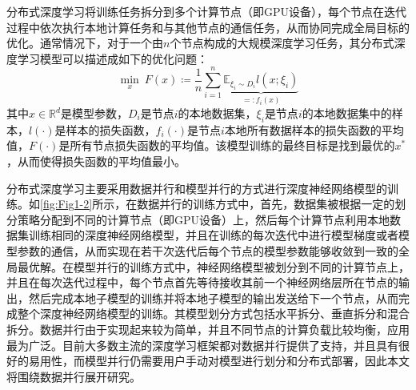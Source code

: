 \begin{table}[!htbp]
    \centering
    \caption{单GPU训练ResNet-269模型的性能\cite{luo2018parameter}}
    \label{tab:GPU性能}
\end{table}

分布式深度学习将训练任务拆分到多个计算节点（即GPU设备），每个节点在迭代过程中依次执行本地计算任务和与其他节点的通信任务，从而协同完成全局目标的优化。通常情况下，对于一个由$n$个节点构成的大规模深度学习任务，其分布式深度学习模型可以描述成如下的优化问题\cite{smola2010architecture}：
\begin{equation}
    \label{equ:distributed_training_optimization_object}
    \min_x \!\:F\left( x \right) \coloneqq \frac{1}{n}\sum_{i=1}^n{\underset{=:f_i(x)}{\underbrace{\mathbb{E}_{\xi _i\sim D_i}l(x;\xi _i)}}}
\end{equation}
其中$x\in \mathbb{R}^d$是模型参数，$D_i$是节点$i$的本地数据集，$\xi _i$是节点$i$的本地数据集中的样本，$l\left( \cdot \right) $是样本的损失函数，$f_i\left( \cdot \right) $是节点$i$本地所有数据样本的损失函数的平均值，$F\left( \cdot \right)$是所有节点损失函数的平均值。该模型训练的最终目标是找到最优的$x^*$，从而使得损失函数的平均值最小。

分布式深度学习主要采用数据并行和模型并行的方式进行深度神经网络模型的训练\cite{tang2020communication}。如\autoref{fig:Fig1-2}所示，在数据并行的训练方式中，首先，数据集被根据一定的划分策略分配到不同的计算节点（即GPU设备）上，然后每个计算节点利用本地数据集训练相同的深度神经网络模型，并且在训练的每次迭代中进行模型梯度或者模型参数的通信，从而实现在若干次迭代后每个节点的模型参数能够收敛到一致的全局最优解。在模型并行的训练方式中，神经网络模型被划分到不同的计算节点上，并且在每次迭代过程中，每个节点首先等待接收其前一个神经网络层所在节点的输出，然后完成本地子模型的训练并将本地子模型的输出发送给下一个节点，从而完成整个深度神经网络模型的训练。其模型划分方式包括水平拆分、垂直拆分和混合拆分\cite{tang2020communication}。数据并行由于实现起来较为简单，并且不同节点的计算负载比较均衡，应用最为广泛。目前大多数主流的深度学习框架都对数据并行提供了支持，并且具有很好的易用性，而模型并行仍需要用户手动对模型进行划分和分布式部署，因此本文将围绕数据并行展开研究。

